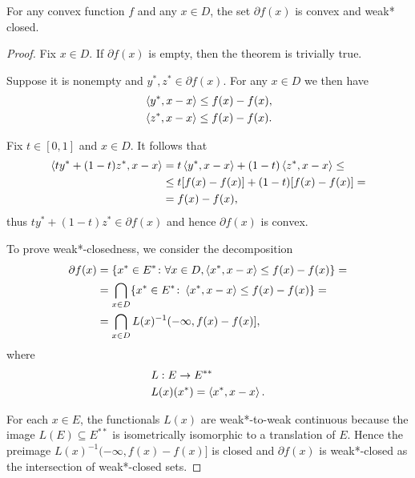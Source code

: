 \begin{proposition}\label{thm:convex_subdifferential_is_convex_and_weak*_closed}\cite[exercise 1.10]{Phelps1993}
  For any convex function \( f \) and any \( x \in D \), the set \( \partial f(x) \) is convex and weak* closed.
\end{proposition}
\begin{proof}
  Fix \( x \in D \). If \( \partial f(x) \) is empty, then the theorem is trivially true.

  Suppose it is nonempty and \( y^*, z^* \in \partial f(x) \). For any \( x \in D \) we then have
  \begin{align*}
    &\left\langle y^*, x - x \right\rangle \leq f(x) - f(x), \\
    &\left\langle z^*, x - x \right\rangle \leq f(x) - f(x).
  \end{align*}

  Fix \( t \in [0, 1] \) and \( x \in D \). It follows that
  \begin{align*}
    \left\langle t y^* + (1-t) z^*, x - x \right\rangle
    &=
    t \left\langle y^*, x - x \right\rangle + (1-t) \left\langle z^*, x - x \right\rangle
    \leq \\ &\leq
    t [f(x) - f(x)] + (1-t) [f(x) - f(x)]
    = \\ &=
    f(x) - f(x),
  \end{align*}
  thus \( t y^* + (1-t)z^* \in \partial f(x) \) and hence \( \partial f(x) \) is convex.

  To prove weak*-closedness, we consider the decomposition
  \begin{align*}
    \partial f(x)
    &=
    \{ x^* \in E^* \colon \forall x \in D, \left\langle x^*, x - x \right\rangle \leq f(x) - f(x) \}
    = \\ &=
    \bigcap_{x \in D} \{ x^* \in E^* \colon \left\langle x^*, x - x \right\rangle \leq f(x) - f(x) \}
    = \\ &=
    \bigcap_{x \in D} L(x)^{-1} (-\infty, f(x) - f(x)],
  \end{align*}
  where
  \begin{align*}
    &L: E \to E^{**} \\
    &L(x)(x^*) = \left\langle x^*, x - x \right\rangle.
  \end{align*}

  For each \( x \in E \), the functionals \( L(x) \) are weak*-to-weak continuous because the image \( L(E) \subseteq E^{**} \) is isometrically isomorphic to a translation of \( E \). Hence the preimage \( L(x)^{-1} (-\infty, f(x) - f(x)] \) is closed and \( \partial f(x) \) is weak*-closed as the intersection of weak*-closed sets.
\end{proof}

